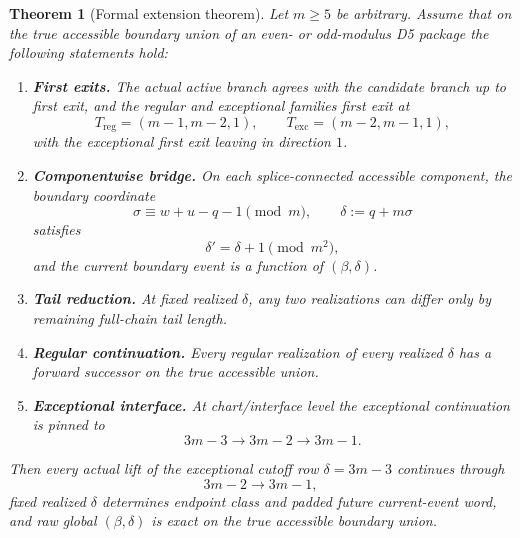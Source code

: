 \documentclass[11pt]{article}
\newtheorem{theorem}{Theorem}
\begin{document}
\begin{theorem}[Formal extension theorem]
\label{thm:formalextension}
Let $m\ge 5$ be arbitrary. Assume that on the true accessible boundary union of
an even- or odd-modulus D5 package the following statements hold:
\begin{enumerate}[label=\textup{(\alph*)},leftmargin=2.5em]
    \item \textbf{First exits.} The actual active branch agrees with the
    candidate branch up to first exit, and the regular and exceptional families
    first exit at
    \[
    T_{\mathrm{reg}}=(m-1,m-2,1),
    \qquad
    T_{\mathrm{exc}}=(m-2,m-1,1),
    \]
    with the exceptional first exit leaving in direction $1$.
    \item \textbf{Componentwise bridge.} On each splice-connected accessible
    component, the boundary coordinate
    \[
    \sigma \equiv w+u-q-1 \pmod m,
    \qquad
    \delta := q+m\sigma
    \]
    satisfies
    \[
    \delta' = \delta + 1 \pmod{m^2},
    \]
    and the current boundary event is a function of $(\beta,\delta)$.
    \item \textbf{Tail reduction.} At fixed realized $\delta$, any two
    realizations can differ only by remaining full-chain tail length.
    \item \textbf{Regular continuation.} Every regular realization of every
    realized $\delta$ has a forward successor on the true accessible union.
    \item \textbf{Exceptional interface.} At chart/interface level the
    exceptional continuation is pinned to
    \[
    3m-3 \to 3m-2 \to 3m-1.
    \]
\end{enumerate}
Then every actual lift of the exceptional cutoff row $\delta=3m-3$ continues
through
\[
3m-2 \to 3m-1,
\]
fixed realized $\delta$ determines endpoint class and padded future current-event
word, and raw global $(\beta,\delta)$ is exact on the true accessible boundary
union.
\end{theorem}
\end{document}
